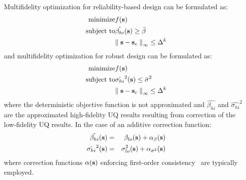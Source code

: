 Multifidelity optimization for reliability-based design can be
formulated as:
\begin{eqnarray}
  {\rm minimize }     & f({\bf s}) \nonumber \\
  {\rm subject \ to } & \hat{\beta_{hi}}({\bf s}) \ge \bar{\beta} \\
& {\parallel {\bf s} - {\bf s}_c \parallel}_\infty \le \Delta^k \nonumber
\label{eq:rbdo_mf}
\end{eqnarray}
and multifidelity optimization for robust design can be formulated as:
\begin{eqnarray}
  {\rm minimize }     & f({\bf s}) \nonumber \\
  {\rm subject \ to } & \hat{\sigma_{hi}}^2({\bf s}) \le \bar{\sigma}^2 \\
& {\parallel {\bf s} - {\bf s}_c \parallel}_\infty \le \Delta^k \nonumber
\label{eq:rdo_mf}
\end{eqnarray}
where the deterministic objective function is not approximated and 
$\hat{\beta_{hi}}$ and $\hat{\sigma_{hi}}^2$ are the approximated
high-fidelity UQ results resulting from correction of the low-fidelity 
UQ results.  In the case of an additive correction function:
\begin{eqnarray}
\hat{\beta_{hi}}({\bf s})    &=& \beta_{lo}({\bf s}) + 
\alpha_{\beta}({\bf s})  \label{eq:corr_lf_beta} \\
\hat{\sigma_{hi}}^2({\bf s}) &=& \sigma_{lo}^2({\bf s}) + 
\alpha_{\sigma^2}({\bf s}) \label{eq:corr_lf_sigma}
\end{eqnarray}
where correction functions $\alpha({\bf s})$ enforcing first-order
consistency~\cite{Eld04} are typically employed.

